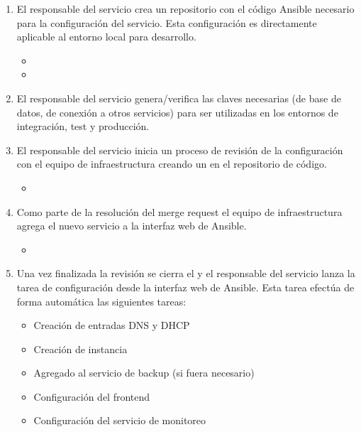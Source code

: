 \begin{enumerate}
\item El responsable del servicio crea un repositorio con el código
  Ansible necesario para la configuración del servicio. Esta
  configuración es directamente aplicable al entorno local para
  desarrollo.
\begin{itemize}
\item {}
\item {}
\end{itemize}
\item El responsable del servicio genera/verifica las claves
  necesarias (de base de datos, de conexión a otros servicios) para
  ser utilizadas en los entornos de integración, test y producción.
\item El responsable del servicio inicia un proceso de revisión de la
  configuración con el equipo de infraestructura creando un
   en el repositorio de código.
\begin{itemize}
\item {}
\end{itemize}
\item Como parte de la resolución del merge request el equipo de
  infraestructura agrega el nuevo servicio a la interfaz web de
  Ansible.
\begin{itemize}
\item {}
\end{itemize}
\item Una vez finalizada la revisión se cierra el  y el responsable del servicio lanza la tarea de
  configuración desde la interfaz web de Ansible. Esta tarea efectúa
  de forma automática las siguientes tareas:
\begin{itemize}
\item Creación de entradas DNS y DHCP
\item Creación de instancia
\item Agregado al servicio de backup (si fuera necesario)
\item Configuración del frontend
\item Configuración del servicio de monitoreo
\end{itemize}
\end{enumerate}

